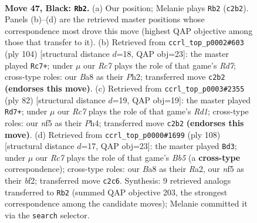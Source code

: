 \documentclass[11pt]{article}
\begin{document}
\clearpage

\begin{figure}[p]\centering
\begin{subfigure}{0.46\textwidth}\centering
\resizebox{\linewidth}{!}{%
\newchessgame
\chessboard[
  setfen={b3k2K/P4p2/7P/4PN2/8/R4p2/2r5/8 b - - 2 47},
  showmover=false,
  pgfstyle=straightmove, color=movearrow, markmove={c2-b2}
]}
\caption{}
\end{subfigure}\hfill
\begin{subfigure}{0.46\textwidth}\centering
\resizebox{\linewidth}{!}{%
\newchessgame
\chessboard[
  setfen={8/3R4/7p/8/r4PP1/p4K2/2k4P/8 w - - 15 53},
  showmover=false,
  pgfstyle=straightmove, color=movearrow, markmove={d7-c7}
]}
\caption{}
\end{subfigure}
\\[4pt]
\begin{subfigure}{0.46\textwidth}\centering
\resizebox{\linewidth}{!}{%
\newchessgame
\chessboard[
  setfen={8/5k2/6p1/p6p/7P/r3PP2/5K2/3R4 w - - 0 42},
  showmover=false,
  pgfstyle=straightmove, color=movearrow, markmove={d1-d7}
]}
\caption{}
\end{subfigure}\hfill
\begin{subfigure}{0.46\textwidth}\centering
\resizebox{\linewidth}{!}{%
\newchessgame
\chessboard[
  setfen={8/2r2pk1/8/1B4p1/4K1P1/8/R1P2b2/8 w - - 0 55},
  showmover=false,
  pgfstyle=straightmove, color=movearrow, markmove={b5-d3}
]}
\caption{}
\end{subfigure}
\caption{\textbf{Move 47, Black: \texttt{Rb2}.} (a) Our position; Melanie plays \texttt{Rb2} (\texttt{c2b2}). Panels (b)--(d) are the retrieved master positions whose correspondence most drove this move (highest QAP objective among those that transfer to it). (b) Retrieved from \texttt{ccrl\_top\_p0002\#603} (ply 104) [structural distance $d$=18, QAP obj=23]: the master played \texttt{Rc7+}; under $\mu$ our \emph{Rc7} plays the role of that game's \emph{Rd7}; cross-type roles: our \emph{B}a8 as their \emph{P}h2; transferred move \texttt{c2b2} \textbf{(endorses this move)}. (c) Retrieved from \texttt{ccrl\_top\_p0003\#2355} (ply 82) [structural distance $d$=19, QAP obj=19]: the master played \texttt{Rd7+}; under $\mu$ our \emph{Rc7} plays the role of that game's \emph{Rd1}; cross-type roles: our \emph{n}f5 as their \emph{P}h4; transferred move \texttt{c2b2} \textbf{(endorses this move)}. (d) Retrieved from \texttt{ccrl\_top\_p0000\#1699} (ply 108) [structural distance $d$=17, QAP obj=23]: the master played \texttt{Bd3}; under $\mu$ our \emph{Rc7} plays the role of that game's \emph{Bb5} (a \textbf{cross-type} correspondence); cross-type roles: our \emph{B}a8 as their \emph{R}a2, our \emph{n}f5 as their \emph{b}f2; transferred move \texttt{c2c6}. Synthesis: 9 retrieved analogs transferred to \texttt{Rb2} (summed QAP objective 203, the strongest correspondence among the candidate moves); Melanie committed it via the \texttt{search} selector.}
\label{fig:thought-m93}
\end{figure}
\end{document}
